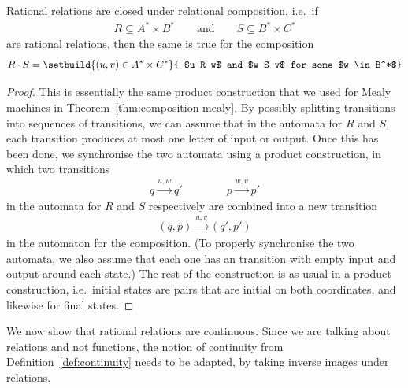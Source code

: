 \begin{theorem}\label{thm:composition-rational-relations}
    Rational relations are closed under relational composition, i.e.~if 
    \begin{align*}
    R \subseteq A^* \times B^* 
    \qquad 
    \text{and}
    \qquad 
    S \subseteq B^* \times C^*
    \end{align*}
    are rational relations, then the same is true for the composition
    \begin{align*}
    R \cdot S = \setbuild{ (u,v) \in A^* \times C^*}{ $u R w$ and $w S v$ for some  $w \in B^*$}
    \end{align*}
\end{theorem}
\begin{proof}
    This is essentially the same product  construction that we used for Mealy machines in Theorem~\ref{thm:composition-mealy}. By possibly splitting transitions into sequences of transitions, we can assume that in the automata for $R$ and $S$, each transition produces at most one letter of input or output. Once this has been done, we synchronise the  two automata using  a product construction, in which two transitions
    \begin{align*}
q \xrightarrow{u,w} q' \qquad  \qquad 
    p \xrightarrow{w,v} p'
    \end{align*}
    in the automata  for $R$ and $S$ respectively
    are combined into a new transition 
    \begin{align*}
    (q,p) \xrightarrow{u,v} (q',p')\end{align*} in the automaton for the composition. (To properly synchronise the two automata, we also assume that each one has an transition with empty input and output around each state.)
    The rest of the construction is as usual in a product construction, i.e.~initial states are pairs that are initial on both coordinates, and likewise for final states.
\end{proof}

We now show that rational relations are continuous. Since we are talking about relations and not functions, the notion of continuity from Definition~\ref{def:continuity} needs to be adapted, by taking inverse images under relations.

